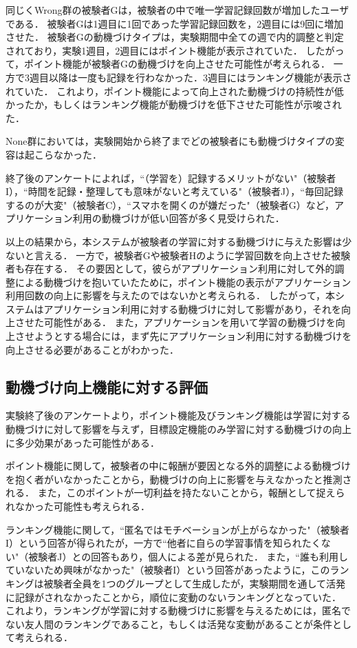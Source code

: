 同じくWrong群の被験者Gは，被験者の中で唯一学習記録回数が増加したユーザである．
被験者Gは1週目に1回であった学習記録回数を，2週目には9回に増加させた．
被験者Gの動機づけタイプは，実験期間中全ての週で内的調整と判定されており，実験1週目，2週目にはポイント機能が表示されていた．
したがって，ポイント機能が被験者Gの動機づけを向上させた可能性が考えられる．
一方で3週目以降は一度も記録を行わなかった．3週目にはランキング機能が表示されていた．
これより，ポイント機能によって向上された動機づけの持続性が低かったか，もしくはランキング機能が動機づけを低下させた可能性が示唆された．

None群においては，実験開始から終了までどの被験者にも動機づけタイプの変容は起こらなかった．

終了後のアンケートによれば，``（学習を）記録するメリットがない"（被験者I），``時間を記録・整理しても意味がないと考えている"（被験者J），``毎回記録するのが大変"（被験者C），``スマホを開くのが嫌だった"（被験者G）など，アプリケーション利用の動機づけが低い回答が多く見受けられた．

以上の結果から，本システムが被験者の学習に対する動機づけに与えた影響は少ないと言える．
一方で，被験者Gや被験者Hのように学習回数を向上させた被験者も存在する．
その要因として，彼らがアプリケーション利用に対して外的調整による動機づけを抱いていたために，ポイント機能の表示がアプリケーション利用回数の向上に影響を与えたのではないかと考えられる．
したがって，本システムはアプリケーション利用に対する動機づけに対して影響があり，それを向上させた可能性がある．
また，アプリケーションを用いて学習の動機づけを向上させようとする場合には，まず先にアプリケーション利用に対する動機づけを向上させる必要があることがわかった．

\subsection{動機づけ向上機能に対する評価}
実験終了後のアンケートより，ポイント機能及びランキング機能は学習に対する動機づけに対して影響を与えず，目標設定機能のみ学習に対する動機づけの向上に多少効果があった可能性がある．

ポイント機能に関して，被験者の中に報酬が要因となる外的調整による動機づけを抱く者がいなかったことから，動機づけの向上に影響を与えなかったと推測される．
また，このポイントが一切利益を持たないことから，報酬として捉えられなかった可能性も考えられる．

ランキング機能に関して，``匿名ではモチベーションが上がらなかった"（被験者I）という回答が得られたが，一方で``他者に自らの学習事情を知られたくない"（被験者J）との回答もあり，個人による差が見られた．
また，``誰も利用していないため興味がなかった"（被験者I）という回答があったように，このランキングは被験者全員を1つのグループとして生成したが，実験期間を通して活発に記録がされなかったことから，順位に変動のないランキングとなっていた．
これより，ランキングが学習に対する動機づけに影響を与えるためには，匿名でない友人間のランキングであること，もしくは活発な変動があることが条件として考えられる．

